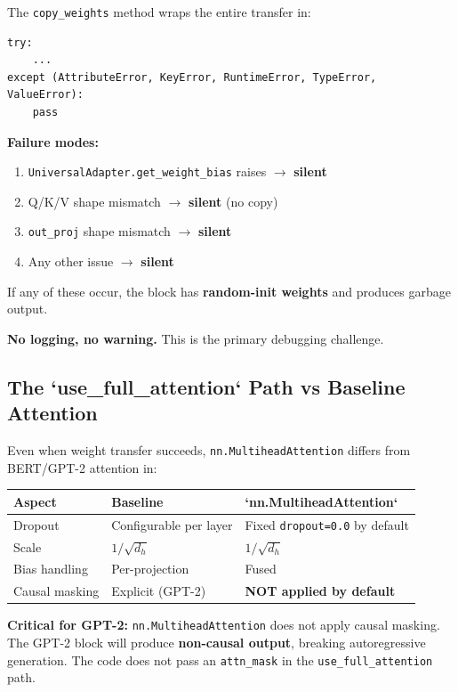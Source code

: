 The \texttt{copy\_weights} method wraps the entire transfer in:

\begin{lstlisting}
try:
    ...
except (AttributeError, KeyError, RuntimeError, TypeError, ValueError):
    pass
\end{lstlisting}

\textbf{Failure modes:}
\begin{enumerate}
\item \texttt{UniversalAdapter.get\_weight\_bias} raises $\to$ \textbf{silent}
\item Q/K/V shape mismatch $\to$ \textbf{silent} (no copy)
\item \texttt{out\_proj} shape mismatch $\to$ \textbf{silent}
\item Any other issue $\to$ \textbf{silent}

\end{enumerate}
If any of these occur, the block has \textbf{random-init weights} and produces 
garbage output.

\textbf{No logging, no warning.} This is the primary debugging challenge.

\subsection{The `use\_full\_attention` Path vs Baseline Attention}

Even when weight transfer succeeds, \texttt{nn.MultiheadAttention} differs from 
BERT/GPT-2 attention in:

\begin{table}[H]
\centering
\small
\begin{tabular}{lll}
\toprule
\textbf{Aspect} & \textbf{Baseline} & \textbf{`nn.MultiheadAttention`} \\
\midrule
Dropout & Configurable per layer & Fixed \texttt{dropout=0.0} by default \\
Scale & $1/\sqrt{d_h}$ & $1/\sqrt{d_h}$ \\
Bias handling & Per-projection & Fused \\
Causal masking & Explicit (GPT-2) & \textbf{NOT applied by default} \\
\bottomrule
\end{tabular}
\end{table}

\textbf{Critical for GPT-2:} \texttt{nn.MultiheadAttention} does not apply causal masking. 
The GPT-2 block will produce \textbf{non-causal output}, breaking autoregressive 
generation. The code does not pass an \texttt{attn\_mask} in the \texttt{use\_full\_attention} 
path.

